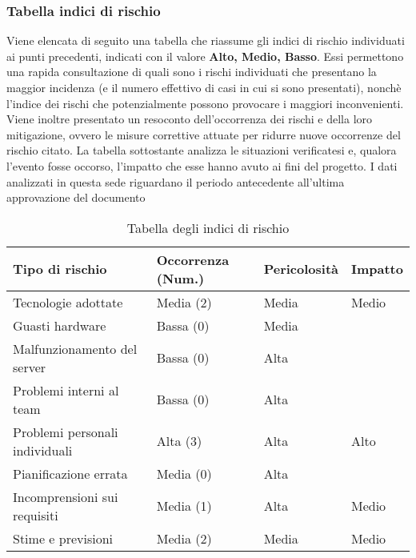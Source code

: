 \begin{minipage}{\linewidth}
	
\subsubsection{Tabella indici di rischio}

Viene elencata di seguito una tabella che riassume gli indici di rischio individuati ai punti precedenti, indicati con il valore \textbf{Alto, Medio, Basso}. Essi permettono una rapida consultazione di quali sono i rischi individuati che presentano la maggior incidenza (e il numero effettivo di casi in cui si sono presentati), nonchè l'indice dei rischi che potenzialmente possono provocare i maggiori inconvenienti. Viene inoltre presentato un resoconto dell'occorrenza dei rischi e della loro mitigazione, ovvero le misure correttive attuate per ridurre nuove occorrenze del rischio citato. La tabella sottostante analizza le situazioni verificatesi e, qualora l'evento fosse occorso, l'impatto che esse hanno avuto ai fini del progetto. I dati analizzati in questa sede riguardano il periodo antecedente all'ultima approvazione del documento

\begin{table}[H]
	\begin{center}
		\begin{tabular}{|p{5cm} | p{4cm} | p{3cm}| p{2cm}|}
			\hline
			\rowcolor{Gray}
			\textbf{Tipo di rischio}	& \textbf{Occorrenza (Num.)} & \textbf{Pericolosità} & \textbf{Impatto}\\
			\hline
			Tecnologie adottate	&	Media (2) 	& 	Media &  Medio	\\
			\hline
			Guasti hardware	&	Bassa (0)	& 	Media	&  \\
			\hline
			Malfunzionamento del server	&	Bassa (0)	& 	Alta	&  \\
			\hline
			Problemi interni al team	&	Bassa (0)	& 	Alta	&  \\
			\hline
			Problemi personali individuali	&	Alta  (3)	& 	Alta	&  Alto\\
			\hline
			Pianificazione errata	&	Media  (0)	& 	Alta	&  \\
			\hline
			Incomprensioni sui requisiti	&	Media (1)	& 	Alta	&  Medio\\
			\hline
			Stime e previsioni	&	Media (2)	& 	Media  &  Medio	\\
			\hline
		\end{tabular}
		\caption{Tabella degli indici di rischio}
	\end{center}
\end{table}
\end{minipage}


